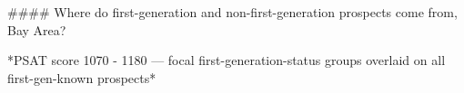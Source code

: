 #### Where do first-generation and non-first-generation prospects come from, Bay Area?

*PSAT score 1070 - 1180 — focal first-generation-status groups overlaid on all first-gen-known prospects*
